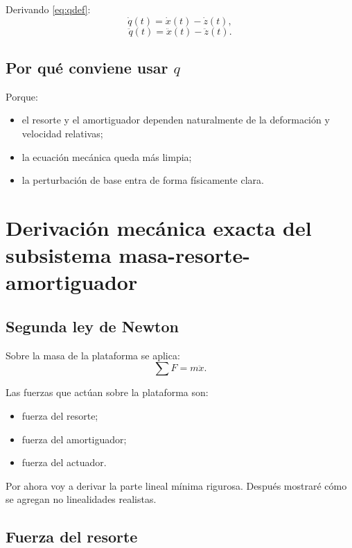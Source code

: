 \documentclass[11pt]{article}
\begin{document}
Derivando \eqref{eq:qdef}:
\begin{equation}
\dot{q}(t)=\dot{x}(t)-\dot{z}(t),
\label{eq:qdot}
\end{equation}
\begin{equation}
\ddot{q}(t)=\ddot{x}(t)-\ddot{z}(t).
\label{eq:qddot}
\end{equation}

\subsection{Por qu\'e conviene usar $q$}

Porque:

\begin{itemize}[leftmargin=1.2cm]
\item el resorte y el amortiguador dependen naturalmente de la deformaci\'on y velocidad relativas;
\item la ecuaci\'on mec\'anica queda m\'as limpia;
\item la perturbaci\'on de base entra de forma f\'isicamente clara.
\end{itemize}

\section{Derivaci\'on mec\'anica exacta del subsistema masa-resorte-amortiguador}

\subsection{Segunda ley de Newton}

Sobre la masa de la plataforma se aplica:
\begin{equation}
\sum F = m\ddot{x}.
\label{eq:newton}
\end{equation}

Las fuerzas que act\'uan sobre la plataforma son:

\begin{itemize}[leftmargin=1.2cm]
\item fuerza del resorte;
\item fuerza del amortiguador;
\item fuerza del actuador.
\end{itemize}

Por ahora voy a derivar la parte lineal m\'inima rigurosa. Despu\'es mostrar\'e c\'omo se agregan no linealidades realistas.

\subsection{Fuerza del resorte}
\end{document}

